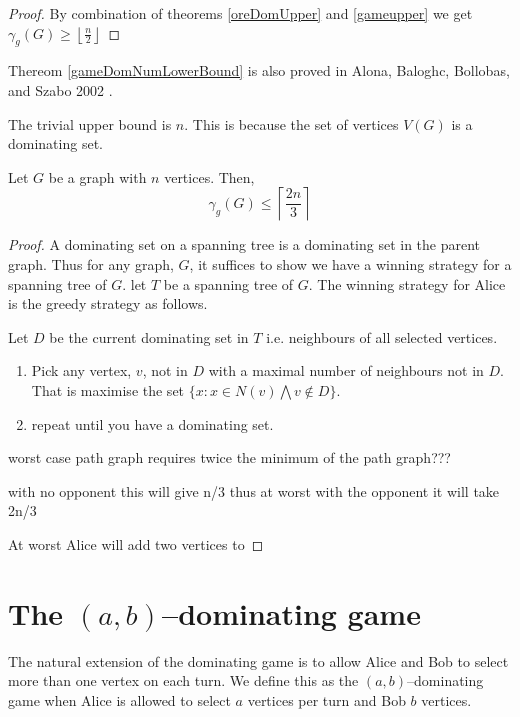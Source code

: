 \begin{proof}
    By combination of theorems \ref{oreDomUpper} and \ref{gameupper} we get  $ \gamma_g(G) \geq \left \lfloor{\frac{n}{2}}\right \rfloor $
\end{proof}

Thereom \ref{gameDomNumLowerBound} is also proved in Alona, Baloghc, Bollobas, and Szabo 2002 \cite{AlBABoSz2002}.

The trivial upper bound is $n$. This is because the set of vertices $V(G)$ is a dominating set.

\begin{theorem}
    Let $G$ be a graph with $n$ vertices. Then,    
    \[ \gamma_g(G) \leq \left\lceil \frac{2n}{3} \right\rceil\]
\end{theorem}
 
\begin{proof}
    A dominating set on a spanning tree is a dominating set in the parent graph.
    Thus for any graph, $G$, it suffices to show we have a winning strategy for a spanning tree of $G$. 
    let $T$ be a spanning tree of $G$.
    The winning strategy for Alice is the greedy strategy as follows. 
    
    Let $D$ be the current dominating set in $T$ i.e. neighbours of all selected vertices.
    \begin{enumerate}
        \item Pick any vertex, $v$, not in $D$ with a maximal number of neighbours not in $D$. That is maximise the set $\{x: x \in N(v) \bigwedge v \notin D\}$.
        \item repeat until you have a dominating set.
    \end{enumerate}

       worst case path graph requires twice the minimum of the path graph???
       
       with no opponent this will give n/3 thus at worst with the opponent it will take 2n/3 
       
    At worst Alice will add two vertices to 
\end{proof}

\section{The $(a,b)$--dominating game}

The natural extension of the dominating game is to allow Alice and Bob to select more than one vertex on each turn. We define this as the $(a,b)$--dominating game when Alice is allowed to select $a$ vertices per turn and Bob $b$ vertices.

